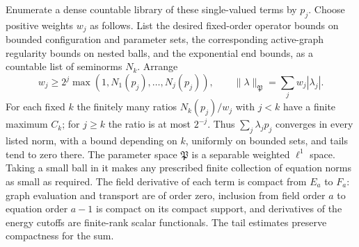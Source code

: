 Enumerate a dense countable library of these single-valued terms by
$p_j$.  Choose positive weights $w_j$ as follows.  List the desired
fixed-order operator bounds on bounded configuration and parameter sets,
the corresponding active-graph regularity bounds on nested balls, and
the exponential end bounds, as a countable list of seminorms $N_k$.
Arrange
\begin{equation}\label{eq:analysis:weights}
 w_j\geq 2^j\max(1,N_1(p_j),\ldots,N_j(p_j)),
 \qquad
 \|\lambda\|_{\mathfrak P}=\sum_j w_j|\lambda_j|.
\end{equation}
For each fixed $k$ the finitely many ratios $N_k(p_j)/w_j$ with $j<k$
have a finite maximum $C_k$; for $j\geq k$ the ratio is at most $2^{-j}$.
Thus $\sum_j\lambda_jp_j$ converges in every listed norm, with a bound
depending on $k$, uniformly on bounded sets, and tails tend to zero there.
The parameter space $\mathfrak P$ is a separable weighted $\ell^1$ space.
Taking a small ball in it makes any prescribed finite collection of
equation norms as small as required.  The field derivative of each term is compact from $E_a$
to $F_a$: graph evaluation and transport are of order zero, inclusion
from field order $a$ to equation order $a-1$ is compact on its compact
support, and derivatives of the energy cutoffs are finite-rank scalar
functionals.  The tail estimates preserve compactness for the sum.

